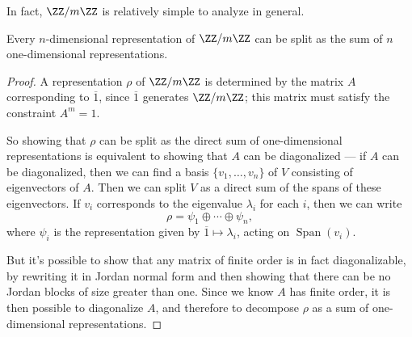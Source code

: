In fact, $\ZZ/m\ZZ$ is relatively simple to analyze in general.

\begin{example}
Every $n$-dimensional representation of $\ZZ/m\ZZ$ can be split as the sum of $n$ one-dimensional representations. 
\end{example}

\begin{proof}
A representation $\rho$ of $\ZZ/m\ZZ$ is determined by the matrix $A$ corresponding to $\overline{1}$, since $\overline{1}$ generates $\ZZ/m\ZZ$; this matrix must satisfy the constraint $A^m = 1$. 

So showing that $\rho$ can be split as the direct sum of one-dimensional representations is equivalent to showing that $A$ can be diagonalized --- if $A$ can be diagonalized, then we can find a basis $\{v_1, \ldots, v_n\}$ of $V$ consisting of eigenvectors of $A$. Then we can split $V$ as a direct sum of the spans of these eigenvectors. If $v_i$ corresponds to the eigenvalue $\lambda_i$ for each $i$, then we can write \[\rho = \psi_1 \oplus \cdots \oplus \psi_n,\] where $\psi_i$ is the representation given by $\overline{1} \mapsto \lambda_i$, acting on $\operatorname{Span}(v_i)$. 


But it's possible to show that any matrix of finite order is in fact diagonalizable, by rewriting it in Jordan normal form and then showing that there can be no Jordan blocks of size greater than one. Since we know $A$ has finite order, it is then possible to diagonalize $A$, and therefore to decompose $\rho$ as a sum of one-dimensional representations. 
\end{proof}

